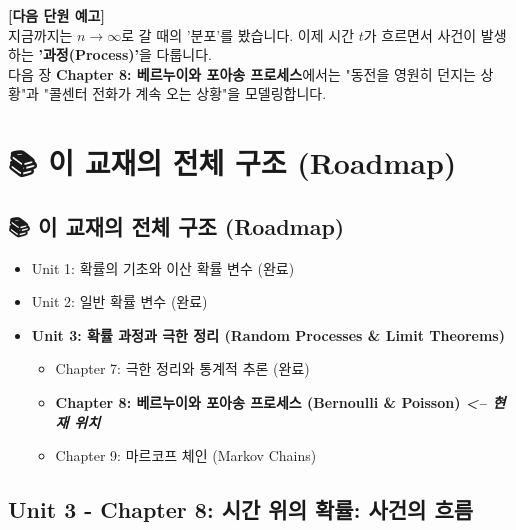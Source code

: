 \documentclass[11pt,a4paper]{book}
\newcommand{\chaptertitle}[2]{\section*{#1: #2}}
\theoremstyle{definition}
\begin{document}
\vspace{0.5cm}
\textbf{[다음 단원 예고]} \\
지금까지는 $n \to \infty$로 갈 때의 '분포'를 봤습니다. 이제 시간 $t$가 흐르면서 사건이 발생하는 \textbf{'과정(Process)'}을 다룹니다. \\
다음 장 \textbf{Chapter 8: 베르누이와 포아송 프로세스}에서는 "동전을 영원히 던지는 상황"과 "콜센터 전화가 계속 오는 상황"을 모델링합니다.


\chapter{📚 이 교재의 전체 구조 (Roadmap)}
\label{ch:lecture8}



\section*{📚 이 교재의 전체 구조 (Roadmap)}
\begin{itemize}
    \item Unit 1: 확률의 기초와 이산 확률 변수 (완료)
    \item Unit 2: 일반 확률 변수 (완료)
    \item \textbf{Unit 3: 확률 과정과 극한 정리 (Random Processes \& Limit Theorems)}
    \begin{itemize}
        \item Chapter 7: 극한 정리와 통계적 추론 (완료)
        \item[$\to$] \textbf{\textcolor{mainblue}{Chapter 8: 베르누이와 포아송 프로세스 (Bernoulli \& Poisson) \textit{<-- 현재 위치}}}
        \item Chapter 9: 마르코프 체인 (Markov Chains)
    \end{itemize}
\end{itemize}
\vspace{1cm}

\chaptertitle{Unit 3 - Chapter 8}{시간 위의 확률: 사건의 흐름}

\end{document}
